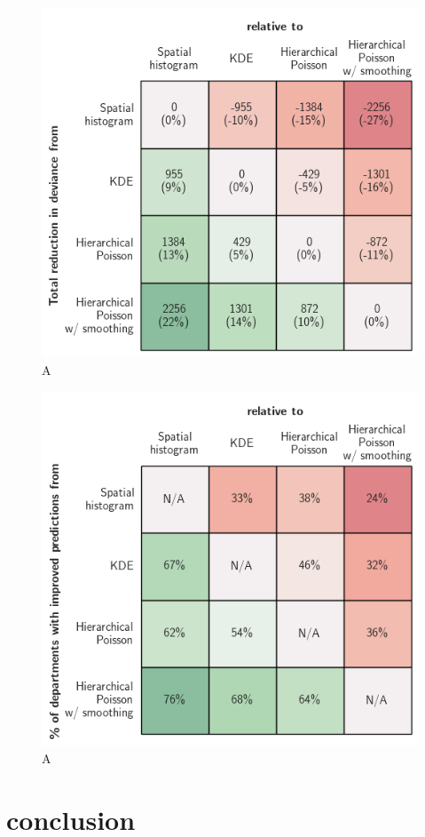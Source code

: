 \documentclass{svjour3}
\begin{document}
    \begin{figure}[htb] \centering
    \includegraphics[width=.5\textwidth]{figures/dev_table.png}
    \caption{A }
    \label{fig:dev_table}
    \end{figure}
  
    \begin{figure}[htb] \centering
    \includegraphics[width=.5\textwidth]{figures/department_comparison.png}
    \caption{A }
    \label{fig:dep_comparison}
    \end{figure}
  
  
  
  
  \section{conclusion}
  
















\clearpage


\end{document}
